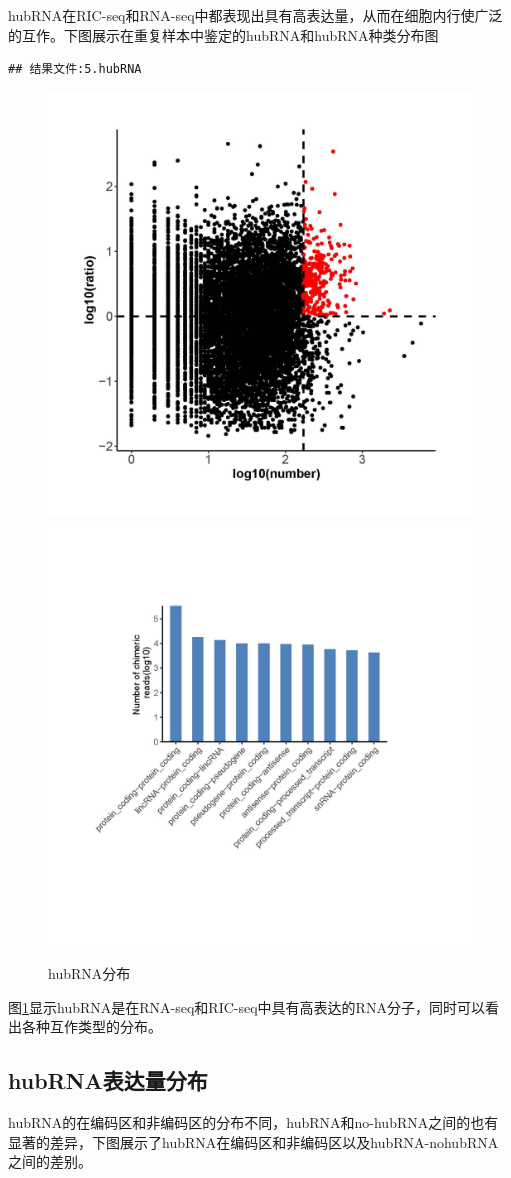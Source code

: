 \documentclass[
]{ctexart}
\begin{document}
hubRNA在RIC-seq和RNA-seq中都表现出具有高表达量，从而在细胞内行使广泛的互作。下图展示在重复样本中鉴定的hubRNA和hubRNA种类分布图

\begin{verbatim}
## 结果文件:5.hubRNA
\end{verbatim}

\begin{figure}[H]

{\centering \includegraphics[width=0.48\linewidth]{./1.picture/hubRNA} \includegraphics[width=0.48\linewidth]{./1.picture/hubRNA_type} 

}

\caption{hubRNA分布}\label{fig:hub1}
\end{figure}

图\ref{fig:hub1}显示hubRNA是在RNA-seq和RIC-seq中具有高表达的RNA分子，同时可以看出各种互作类型的分布。

\hypertarget{hubrnaux8868ux8fbeux91cfux5206ux5e03}{%
\subsection{hubRNA表达量分布}\label{hubrnaux8868ux8fbeux91cfux5206ux5e03}}

hubRNA的在编码区和非编码区的分布不同，hubRNA和no-hubRNA之间的也有显著的差异，下图展示了hubRNA在编码区和非编码区以及hubRNA-nohubRNA之间的差别。
\end{document}
